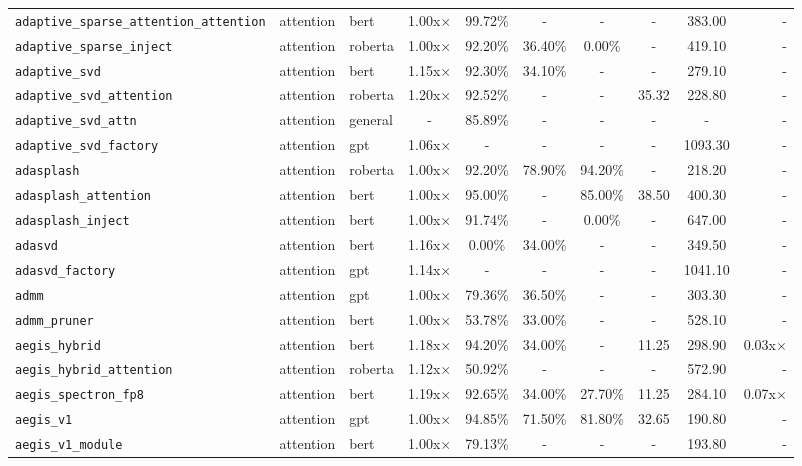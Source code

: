 \begin{center}
\begin{longtable}{lllccccccr}
\texttt{adaptive\_sparse\_attention\_attention} & attention & bert & 1.00x$\times$ & 99.72\% & - & - & - & 383.00 & - \\
\texttt{adaptive\_sparse\_inject} & attention & roberta & 1.00x$\times$ & 92.20\% & 36.40\% & 0.00\% & - & 419.10 & - \\
\texttt{adaptive\_svd} & attention & bert & 1.15x$\times$ & 92.30\% & 34.10\% & - & - & 279.10 & - \\
\texttt{adaptive\_svd\_attention} & attention & roberta & 1.20x$\times$ & 92.52\% & - & - & 35.32 & 228.80 & - \\
\texttt{adaptive\_svd\_attn} & attention & general & - & 85.89\% & - & - & - & - & - \\
\texttt{adaptive\_svd\_factory} & attention & gpt & 1.06x$\times$ & - & - & - & - & 1093.30 & - \\
\texttt{adasplash} & attention & roberta & 1.00x$\times$ & 92.20\% & 78.90\% & 94.20\% & - & 218.20 & - \\
\texttt{adasplash\_attention} & attention & bert & 1.00x$\times$ & 95.00\% & - & 85.00\% & 38.50 & 400.30 & - \\
\texttt{adasplash\_inject} & attention & bert & 1.00x$\times$ & 91.74\% & - & 0.00\% & - & 647.00 & - \\
\texttt{adasvd} & attention & bert & 1.16x$\times$ & 0.00\% & 34.00\% & - & - & 349.50 & - \\
\texttt{adasvd\_factory} & attention & gpt & 1.14x$\times$ & - & - & - & - & 1041.10 & - \\
\texttt{admm} & attention & gpt & 1.00x$\times$ & 79.36\% & 36.50\% & - & - & 303.30 & - \\
\texttt{admm\_pruner} & attention & bert & 1.00x$\times$ & 53.78\% & 33.00\% & - & - & 528.10 & - \\
\texttt{aegis\_hybrid} & attention & bert & 1.18x$\times$ & 94.20\% & 34.00\% & - & 11.25 & 298.90 & 0.03x$\times$ \\
\texttt{aegis\_hybrid\_attention} & attention & roberta & 1.12x$\times$ & 50.92\% & - & - & - & 572.90 & - \\
\texttt{aegis\_spectron\_fp8} & attention & bert & 1.19x$\times$ & 92.65\% & 34.00\% & 27.70\% & 11.25 & 284.10 & 0.07x$\times$ \\
\texttt{aegis\_v1} & attention & gpt & 1.00x$\times$ & 94.85\% & 71.50\% & 81.80\% & 32.65 & 190.80 & - \\
\texttt{aegis\_v1\_module} & attention & bert & 1.00x$\times$ & 79.13\% & - & - & - & 193.80 & - \\

\end{longtable}
\end{center}
